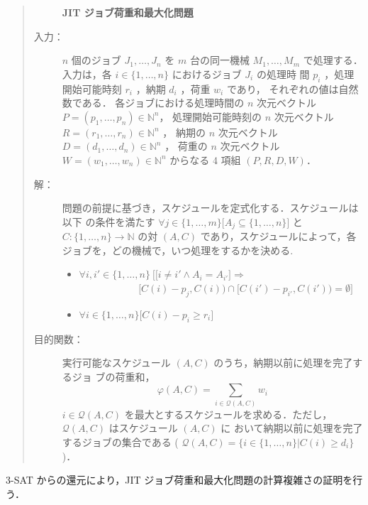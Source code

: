 \documentclass[12pt]{optlab-bachelor}
\begin{document}
\begin{quote}
  \begin{description}
    \item[] {\bf JIT ジョブ荷重和最大化問題}
    \item[入力：] $n$ 個のジョブ $J_1,\ldots,J_n$ を $m$ 台の同一機械 $M_1,\ldots,M_m$
    で処理する．入力は，各 $i \in \{1,\ldots,n\}$ におけるジョブ $J_i$ の処理時
    間 $p_i$ ，処理開始可能時刻 $r_i$ ，納期 $d_i$ ，荷重 $w_i$ であり，
    それぞれの値は自然数である．
    各ジョブにおける処理時間の $n$ 次元ベクトル $P = (p_1,\ldots,p_n) \in \mathbb{N}^n$，
    処理開始可能時刻の $n$ 次元ベクトル $R = (r_1,\ldots,r_n) \in \mathbb{N}^n$ ，
    納期の $n$ 次元ベクトル $D = (d_1,\ldots,d_n) \in \mathbb{N}^n$ ，
    荷重の $n$ 次元ベクトル $W = (w_1,\ldots,w_n) \in \mathbb{N}^n$ からなる 4 項組 $(P,R,D,W)$．
    \item[解：] 問題の前提に基づき，スケジュールを定式化する．スケジュールは以下
    の条件を満たす $\forall j \in \{1,\ldots,m\}\big[A_j \subseteq
    \{1,\ldots,n\}\big]$ と $C : \{1,\ldots,n\} \to \mathbb{N}$ の対 $(A,
    C)$ であり，スケジュールによって，各ジョブを，どの機械で，いつ処理をするかを決める.
    \begin{itemize}
      \item $\forall i, i' \in \{1,\ldots,n\}\ \Big[ \big[i \neq i' \land A_i = A_{i'}\big] \Rightarrow$ \\ $~~~~~~~~~~~~~~~~~~~~~~~~~~~[C(i) - p_j, C(i)) \cap [C(i') - p_{i'}, C(i')) = \emptyset \Big]$
      \item  $\forall i \in \{1,\ldots,n\}\big[C(i) - p_i \ge r_i\big]$
    \end{itemize}
    \item[目的関数：] 実行可能なスケジュール $(A, C)$ のうち，納期以前に処理を完了するジョ
    ブの荷重和，
    \begin{displaymath}
      \displaystyle \varphi(A,C) = \sum_{i \in \mathcal{Q}(A,C)}w_i
    \end{displaymath}
    $i \in \mathcal{Q}(A,C)$ を最大とするスケジュールを求める．ただし，
    $\mathcal{Q}(A, C)$ はスケジュール $(A, C)$ に
    おいて納期以前に処理を完了するジョブの集合である (
    $\mathcal{Q}(A, C) = \{i \in \{1,\ldots, n\} | C(i) \ge d_i \}$ )．
  \end{description}
\end{quote}

\textsc{3-SAT} からの還元により，JIT ジョブ荷重和最大化問題の計算複雑さの証明を行う．
\end{document}
